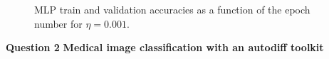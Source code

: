 \documentclass[12pt]{article}
\begin{document}
\begin{enumerate}[leftmargin=\labelsep]
\begin{enumerate}[label=\alph*)]
                    \begin{figure}[H]
                        \centering
                        
                        \caption{MLP train and validation accuracies as a function of the epoch number for $\eta = 0.001$.}
                        \label{fig:mlp-20-0.001}
                    \end{figure}

                    \vspace{12pt}

          \end{enumerate}

\end{enumerate}

\vspace{12pt}

\center\large{\textbf{Question 2}}
\center\textbf{Medical image classification with an autodiff toolkit}
\end{document}
